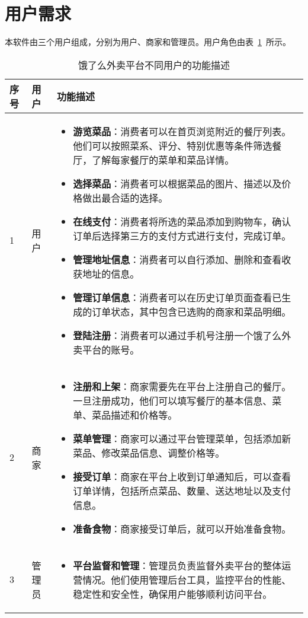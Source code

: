 \section{用户需求}
本软件由三个用户组成，分别为用户、商家和管理员。用户角色由表~\ref{tab:table1}~所示。
\begin{table}[htbp]
\caption{饿了么外卖平台不同用户的功能描述}\label{tab:table1}
\vspace{0.5em}\wuhao
\begin{tabularx}{\textwidth}{llX}
\toprule[1.5pt]
序号 & 用户 & 功能描述 \\ 
\midrule[1pt]
1 & 用户 & 
\begin{itemize}
    \item{\textbf{游览菜品}}：消费者可以在首页浏览附近的餐厅列表。他们可以按照菜系、评分、特别优惠等条件筛选餐厅，了解每家餐厅的菜单和菜品详情。
    \item{\textbf{选择菜品}}：消费者可以根据菜品的图片、描述以及价格做出最合适的选择。
    \item{\textbf{在线支付}}：消费者将所选的菜品添加到购物车，确认订单后选择第三方的支付方式进行支付，完成订单。
    \item {\textbf{管理地址信息}}：消费者可以自行添加、删除和查看收获地址的信息。
    \item {\textbf{管理订单信息}}：消费者可以在历史订单页面查看已生成的订单状态，其中包含已选购的商家和菜品明细。
    \item {\textbf{登陆注册}}：消费者可以通过手机号注册一个饿了么外卖平台的账号。
\end{itemize}
\\
2 & 商家 & 
\begin{itemize}
    \item{\textbf{注册和上架}}：商家需要先在平台上注册自己的餐厅。一旦注册成功，他们可以填写餐厅的基本信息、菜单、菜品描述和价格等。
    \item{\textbf{菜单管理}}：商家可以通过平台管理菜单，包括添加新菜品、修改菜品信息、调整价格等。
    \item{\textbf{接受订单}}：商家在平台上收到订单通知后，可以查看订单详情，包括所点菜品、数量、送达地址以及支付信息。
    \item {\textbf{准备食物}}：商家接受订单后，就可以开始准备食物。
\end{itemize}
\\
3 & 管理员 & 
\begin{itemize}
    \item{\textbf{平台监督和管理}}：管理员负责监督外卖平台的整体运营情况。他们使用管理后台工具，监控平台的性能、稳定性和安全性，确保用户能够顺利访问平台。

\end{itemize}
\end{tabularx}
\end{table}
